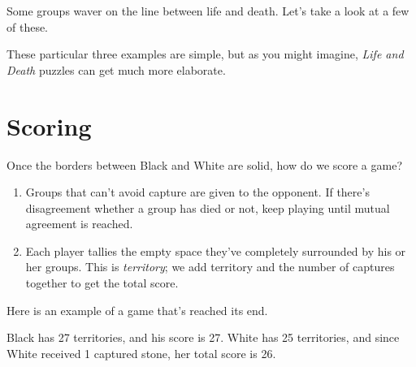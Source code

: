 \documentclass{article}
\begin{document}
Some groups waver on the line between life and death.  Let's take a
look at a few of these.
\begin{center}
\hspace{.3in}
\hspace{.3in}
\end{center}
These particular three examples are simple, but as you might imagine,
\emph{Life and Death} puzzles can get much more elaborate.



\section*{Scoring}

Once the borders between Black and White are solid, how do we score a game?
\begin{enumerate}
\item Groups that can't avoid capture are given to the opponent.  If
there's disagreement whether a group has died or not, keep playing
until mutual agreement is reached.

\item Each player tallies the empty space they've completely surrounded
  by his or her groups.  This is \emph{territory}; we add territory
  and the number of captures together to get the total score.
\end{enumerate}
%
Here is an example of a game that's reached its end.
\begin{center}
\hspace{.3in}
\hspace{.3in}
\end{center}
Black has 27 territories, and his score is 27.  White has 25
territories, and since White received 1 captured stone, her total
score is 26.
\end{document}
